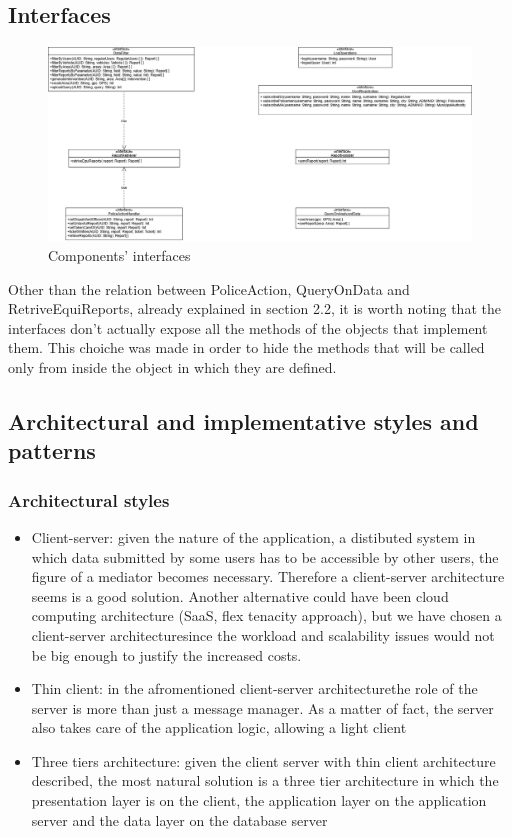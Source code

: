 \subsection{Interfaces}
\begin{figure}[H]
	\centering
	\includegraphics[width=\textwidth]{Images/interface_diagram}
	\caption{Components' interfaces}
\end{figure}
Other than the relation between PoliceAction, QueryOnData and RetriveEquiReports, already explained in section 2.2, it is worth noting that the interfaces don't actually expose all the methods of the objects that implement them. This choiche was made in order to hide the methods that will be called only from inside the object in which they are defined.
\newpage 

\subsection{Architectural and implementative styles and patterns}

\subsubsection{Architectural styles}
\begin{itemize}
	\item Client-server: given the nature of the application, a distibuted system in which data submitted by some users has to be accessible by other users, the figure of a mediator becomes necessary. Therefore a client-server architecture seems is a good solution. Another alternative could have been cloud computing architecture (SaaS, flex tenacity approach), but we have chosen a client-server architecturesince the workload and scalability issues would not be big enough to justify the increased costs.
	\item Thin client: in the afromentioned client-server architecturethe role of the server is more than just a message manager. As a matter of fact, the server also takes care of the application logic, allowing a light client
	\item Three tiers architecture: given the client server with thin client architecture described, the most natural solution is a three tier architecture in which the presentation layer is on the client, the application layer on the application server and the data layer on the database server 
\end{itemize}

